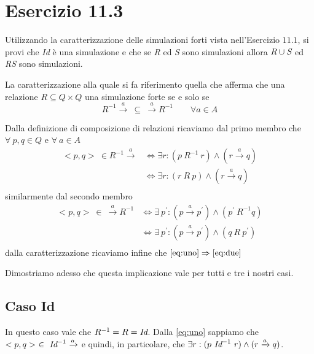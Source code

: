 		\newpage
		
	\section{Esercizio 11.3}
		Utilizzando la caratterizzazione delle simulazioni forti vista
		nell'Esercizio $11.1$, si provi che \emph{Id} \`e una simulazione e che se
		\emph{R} ed \emph{S} sono simulazioni allora $\emph{R} \cup \emph{S}$ ed
		\emph{RS} sono simulazioni.
		
		\sectionline
		La caratterizzazione alla quale si fa riferimento \eacc quella che afferma che una relazione $R \subseteq Q \times Q$ \eacc una simulazione forte se e solo se $$R^{-1} \xrightarrow{a} \ \subseteq \ \xrightarrow{a}R^{-1} \qquad \forall a \in A$$
		
		Dalla definizione di composizione di relazioni ricaviamo dal primo membro che $\forall \ p,q \in Q$ e $\forall \ a \in A$
		\begin{equation}
		\label{eq:uno}
		\begin{aligned}
		<p,q>\ \in R^{-1}\xrightarrow{a} & \Leftrightarrow \exists r: (p \ R^{-1} \ r) \land (r \xrightarrow{a} q)\\
		& \Leftrightarrow \exists r: (r \ R \ p) \land (r \xrightarrow{a} q)\\
		\end{aligned}
		\end{equation}
		similarmente dal secondo membro
		\begin{equation}
		\label{eq:due}
		\begin{aligned}
		<p,q>\ \in \ \xrightarrow{a} R^{-1} & \Leftrightarrow \exists \ p^{'}: (p \xrightarrow{a} p^{'}) \land (p^{'} \ R^{-1} q)\\
		& \Leftrightarrow \exists \ p^{'}: (p \xrightarrow{a} p^{'}) \land (q \ R \ p^{'})\\
		\end{aligned}
		\end{equation}
		dalla caratterizzazione ricaviamo infine che $\eqref{eq:uno} \Rightarrow \eqref{eq:due}$
		
		Dimostriamo adesso che questa implicazione vale per tutti e tre i nostri casi.
		
		\subsection{Caso Id}
		
		In questo caso vale che $R^{-1} = R = \emph{Id}$. Dalla \eqref{eq:uno} sappiamo che $<p,q>\ \in \ \emph{Id}^{-1} \xrightarrow{a}$ e quindi, in particolare, che $\exists r: (p \ \emph{Id}^{-1} \ r) \land (r \xrightarrow{a} q)$.
		
